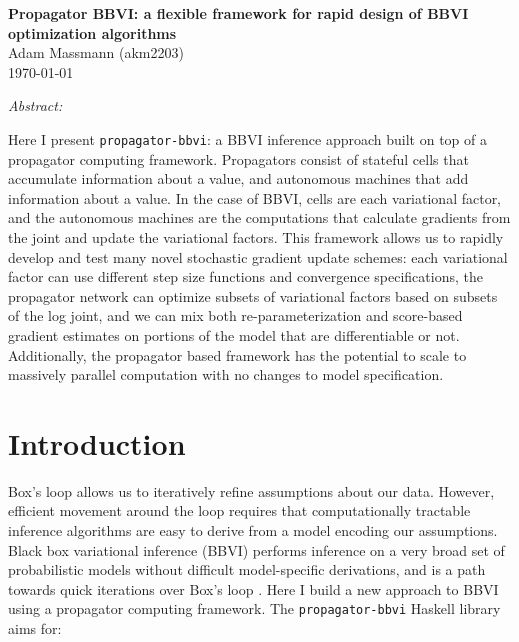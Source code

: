 \documentclass[12pt]{article}
\begin{document}
\begin{flushleft}
\textbf{Propagator BBVI: a flexible framework for rapid design of BBVI
  optimization algorithms} \\
Adam Massmann (akm2203) \\
\today
\end{flushleft}

\textit{Abstract:}

Here I present \texttt{propagator-bbvi}: a BBVI inference approach
built on top of a propagator computing framework. Propagators consist
of stateful cells that accumulate information about a value, and
autonomous machines that add information about a value. In the case of
BBVI, cells are each variational factor, and the autonomous machines
are the computations that calculate gradients from the joint and
update the variational factors. This framework allows us to rapidly
develop and test many novel stochastic gradient update schemes: each
variational factor can use different step size functions and
convergence specifications, the propagator network can optimize
subsets of variational factors based on subsets of the log joint, and
we can mix both re-parameterization and score-based gradient estimates
on portions of the model that are differentiable or not. Additionally,
the propagator based framework has the potential to scale to massively
parallel computation with no changes to model specification.

\section{Introduction}

Box's loop allows us to iteratively refine assumptions about our
data. However, efficient movement around the loop requires that
computationally tractable inference algorithms are easy to derive from
a model encoding our assumptions. Black box variational inference
(BBVI) performs inference on a very broad set of probabilistic models
without difficult model-specific derivations, and is a path towards
quick iterations over Box's loop \citep[e.g.,][]{ranganath-2014,
  kuc-2017}. Here I build a new approach to BBVI using a propagator
computing framework. The \texttt{propagator-bbvi} Haskell library aims
for:
\end{document}
